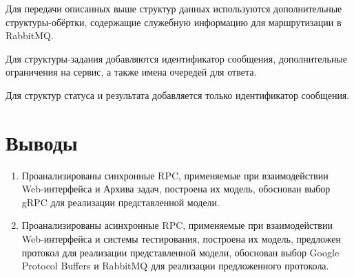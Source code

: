 Для передачи описанных выше структур данных используются дополнительные
структуры-обёртки, содержащие служебную информацию для маршрутизации в RabbitMQ.

Для структуры-задания добавляются идентификатор сообщения, дополнительные
ограничения на сервис, а также имена очередей для ответа.

Для структур статуса и результата добавляется только идентификатор сообщения.



\section{Выводы}
\begin{enumerate}
    \item Проанализированы синхронные RPC, применяемые при взаимодействии
        Web-интерфейса и Архива задач, построена их модель,
        обоснован выбор gRPC для реализации представленной модели.
    \item Проанализированы асинхронные RPC, применяемые при взаимодействии
        Web-интерфейса и системы тестирования, построена их модель,
        предложен протокол для реализации представленной модели,
        обоснован выбор Google Protocol Buffers и RabbitMQ для реализации
        предложенного протокола.
\end{enumerate}

